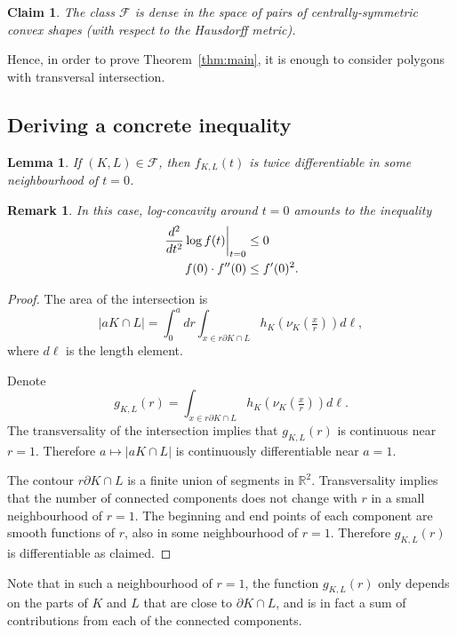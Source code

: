 \documentclass[a4paper,10pt,twoside,reqno,intlimits]{amsart}
\newtheorem*{lemma}{Lemma}
\newtheorem*{claim}{Claim}
\newtheorem*{remark}{Remark}
\begin{document}
\begin{claim}
The class ${\mathcal{F}}$ is dense in the space of pairs of centrally-symmetric convex shapes
(with respect to the Hausdorff metric).
\end{claim}

Hence, in order to prove Theorem~\ref{thm:main}, it is enough to consider polygons with transversal intersection.

\subsection*{Deriving a concrete inequality}
\begin{lemma}
If $(K,L) \in {\mathcal{F}}$, then $f_{K,L}(t)$ is twice differentiable in some neighbourhood of $t=0$.
\end{lemma}

\begin{remark}
In this case, log-concavity around $t=0$ amounts to the inequality
\begin{align}
\left. \frac{d^2}{dt^2} \log f(t) \right| _{t=0} & \le 0 \notag \\
f(0) \cdot f''(0) & \le f'(0)^2 . \label{eq:derivs-f}
\end{align}
\end{remark}

\begin{proof}
The area of the intersection is
$$ |a K \cap L| = \int _0^a dr \int _{x \in r {\partial K} \cap L} h_K(\nu_K(\tfrac{x}{r})) d\ell , $$
where $d\ell$ is the length element.

Denote
$$ g_{K,L}(r) = \int _{x \in r {\partial K} \cap L} h_K(\nu_K(\tfrac{x}{r})) d\ell . $$
The transversality of the intersection implies that $g_{K,L}(r)$ is continuous near $r=1$.
Therefore $a \mapsto |a K \cap L|$ is continuously differentiable near $a=1$.

The contour $r {\partial K} \cap L$ is a finite union of segments in ${\mathbb{R}}^2$.
Transversality implies that the number of connected components does not change with $r$ in a small
neighbourhood of $r=1$.
The beginning and end points of each component are smooth functions of $r$, also in some neighbourhood of $r=1$.
Therefore $g_{K,L}(r)$ is differentiable as claimed.
\end{proof}

Note that in such a neighbourhood of $r=1$, the function $g_{K,L}(r)$ only depends on the parts of $K$ and $L$
that are close to ${\partial K} \cap L$, and is in fact a sum of contributions from each of the connected components.
\end{document}
